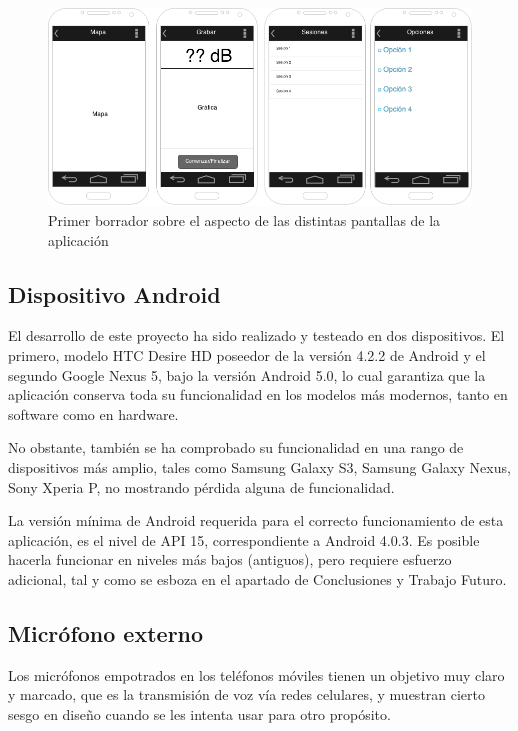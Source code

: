 \begin{figure}[h] \centering
    \includegraphics[width=15cm]{graphs/mockup.png} \caption{Primer borrador sobre el aspecto de las distintas pantallas de la aplicación}\label{fig:mockup}
\end{figure}
\subsection{Dispositivo Android}

El desarrollo de este proyecto ha sido realizado y testeado en dos dispositivos. El primero, modelo HTC Desire HD poseedor de la versión 4.2.2 de Android y el segundo Google Nexus 5, bajo la versión Android 5.0, lo cual garantiza que la aplicación conserva toda su funcionalidad en los modelos más modernos, tanto en software como en hardware. 

No obstante, también se ha comprobado su funcionalidad en una rango de dispositivos más amplio, tales como Samsung Galaxy S3, Samsung Galaxy Nexus, Sony Xperia P, no mostrando pérdida alguna de funcionalidad.

La versión mínima de Android requerida para el correcto funcionamiento de esta aplicación, es el nivel de \ac{API} 15, correspondiente a Android 4.0.3. Es posible hacerla funcionar en niveles más bajos (antiguos), pero requiere esfuerzo adicional, tal y como se esboza en el apartado de Conclusiones y Trabajo Futuro.

\subsection{Micrófono externo}

Los micrófonos empotrados en los teléfonos móviles tienen un objetivo muy claro y marcado, que es la transmisión de voz vía redes celulares, y muestran cierto sesgo en diseño cuando se les intenta usar para otro propósito.

